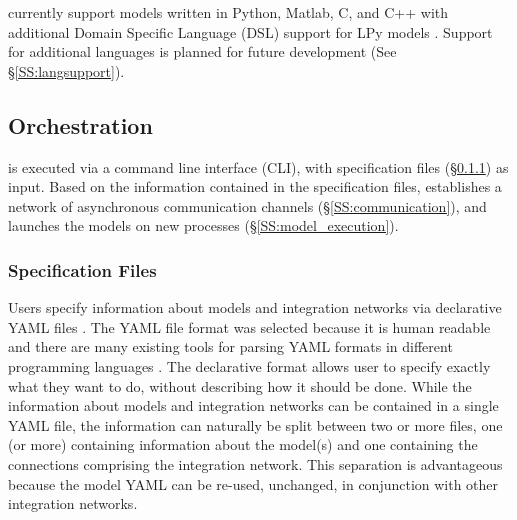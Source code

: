 \documentclass[journal]{IEEEtran}
\newcommand{\todo}[1]{{\color{red}{#1}}}
\newcommand{\pkg}{{\tt \todo{cis\_interface}}{}}
\newcommand{\pkgrun}{{\tt \todo{cisrun}}}
\begin{document}
{\pkg} currently support models written in Python, Matlab, C, and C++ with 
additional Domain Specific Language (DSL) support for LPy models \citep{Boudon2012}. Support for additional languages is planned for future development (See \S\ref{SS:langsupport}).

\subsection{Orchestration}\label{SS:orchestration}
%
{\pkg} is executed via a command line interface (CLI), {\pkgrun} with specification files (\S\ref{SSS:yaml}) as input. Based on the information contained in the specification files, {\pkg} establishes a network of asynchronous communication channels (\S\ref{SS:communication}), and launches the models on new processes (\S\ref{SS:model_execution}).

\subsubsection{Specification Files}\label{SSS:yaml}
%
Users specify information about models and integration networks via declarative 
YAML files \citep{Ben-Kiki2009}. The YAML file format was selected because it is human readable 
and there are many existing tools for parsing YAML formats in different programming 
languages \citep[e.g.][]{Simonov2006,pyyaml,jsyaml}. The declarative format allows user to specify exactly what they 
want to do, without describing how it should be done. While the information 
about models and integration networks can be contained in a single YAML 
file, the information can naturally be split between two or more files, one (or more) containing 
information about the model(s) and one containing the connections comprising the 
integration network. This separation is advantageous because the model YAML 
can be re-used, unchanged, in conjunction with other integration networks. 
\end{document}

